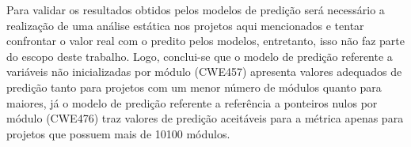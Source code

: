 Para validar os resultados obtidos pelos modelos de predição será necessário a
realização de uma análise estática nos projetos aqui mencionados e tentar
confrontar o valor real com o predito pelos modelos, entretanto, isso não faz
parte do escopo deste trabalho. Logo, conclui-se que o modelo de predição
referente a variáveis não inicializadas por módulo (CWE457) apresenta valores
adequados de predição tanto para projetos com um menor número de módulos quanto
para maiores, já o modelo de predição referente a referência a ponteiros nulos
por módulo (CWE476) traz valores de predição aceitáveis para a métrica apenas
para projetos que possuem mais de 10100 módulos.
